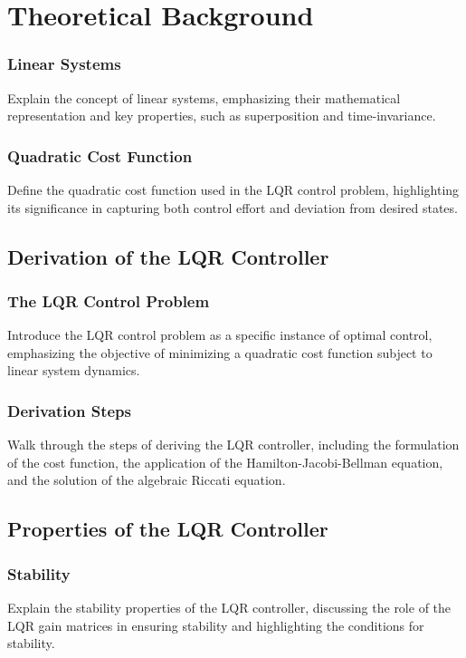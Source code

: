 \documentclass[10pt,twocolumn,twoside,lineno]{pnas-new}
\begin{document}
\section*{Theoretical Background}

\subsubsection*{Linear Systems}
Explain the concept of linear systems, emphasizing their mathematical representation and key properties, such as superposition and time-invariance.

\subsubsection*{Quadratic Cost Function}
Define the quadratic cost function used in the LQR control problem, highlighting its significance in capturing both control effort and deviation from desired states.

\subsection*{Derivation of the LQR Controller}

\subsubsection*{The LQR Control Problem}
Introduce the LQR control problem as a specific instance of optimal control, emphasizing the objective of minimizing a quadratic cost function subject to linear system dynamics.

\subsubsection*{Derivation Steps}
Walk through the steps of deriving the LQR controller, including the formulation of the cost function, the application of the Hamilton-Jacobi-Bellman equation, and the solution of the algebraic Riccati equation.

\subsection*{Properties of the LQR Controller}

\subsubsection*{Stability}
Explain the stability properties of the LQR controller, discussing the role of the LQR gain matrices in ensuring stability and highlighting the conditions for stability.
\end{document}
